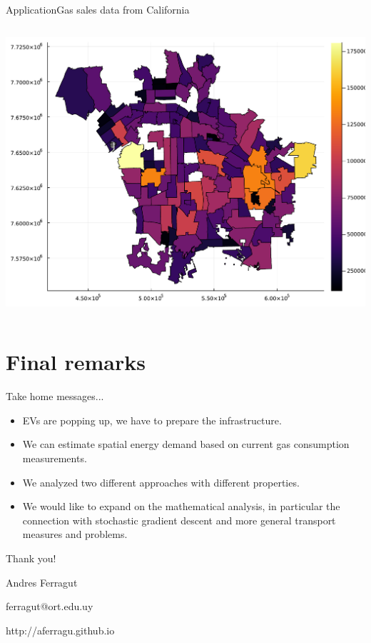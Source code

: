 \documentclass[aspectratio=169]{beamer}
\begin{document}
\begin{frame}{Application}{Gas sales data from California}
\begin{columns}
\begin{column}{0.33\textwidth}
		\centering
		\includegraphics[width=\columnwidth]{figuras/estimated.pdf}		
	\end{column}

\end{columns}

\end{frame}

	

\section{Final remarks}

\begin{frame}{Take home messages...}
\begin{itemize}
	\item EVs are popping up, we have to prepare the infrastructure.
	
	\vfill
	\item We can estimate spatial energy demand based on current gas consumption measurements.
	
	\vfill
	\item We analyzed two different approaches with different properties.
	
	\vfill
	\item We would like to expand on the mathematical analysis, in particular the connection with stochastic gradient descent and more general transport measures and problems.
\end{itemize}
\end{frame}

\begin{frame}[plain]
	
	
	\vfill
	
	{\Huge \alert{Thank you!}}
	
	
	\vfill
	
	Andres Ferragut
	
	ferragut@ort.edu.uy
	
	\alert{http://aferragu.github.io}
	
	
\end{frame}
\end{document}
